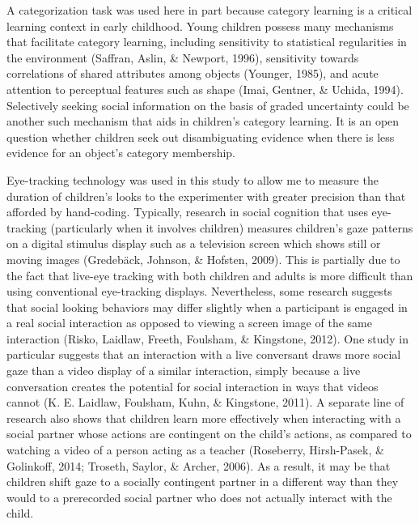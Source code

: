 \documentclass[floatsintext,man]{apa6}
\theoremstyle{definition}
\theoremstyle{definition}
\theoremstyle{definition}
\theoremstyle{remark}
\begin{document}
A categorization task was used here in part because category learning is
a critical learning context in early childhood. Young children possess
many mechanisms that facilitate category learning, including sensitivity
to statistical regularities in the environment (Saffran, Aslin, \&
Newport, 1996), sensitivity towards correlations of shared attributes
among objects (Younger, 1985), and acute attention to perceptual
features such as shape (Imai, Gentner, \& Uchida, 1994). Selectively
seeking social information on the basis of graded uncertainty could be
another such mechanism that aids in children's category learning. It is
an open question whether children seek out disambiguating evidence when
there is less evidence for an object's category membership.

Eye-tracking technology was used in this study to allow me to measure
the duration of children's looks to the experimenter with greater
precision than that afforded by hand-coding. Typically, research in
social cognition that uses eye-tracking (particularly when it involves
children) measures children's gaze patterns on a digital stimulus
display such as a television screen which shows still or moving images
(Gredebäck, Johnson, \& Hofsten, 2009). This is partially due to the
fact that live-eye tracking with both children and adults is more
difficult than using conventional eye-tracking displays. Nevertheless,
some research suggests that social looking behaviors may differ slightly
when a participant is engaged in a real social interaction as opposed to
viewing a screen image of the same interaction (Risko, Laidlaw, Freeth,
Foulsham, \& Kingstone, 2012). One study in particular suggests that an
interaction with a live conversant draws more social gaze than a video
display of a similar interaction, simply because a live conversation
creates the potential for social interaction in ways that videos cannot
(K. E. Laidlaw, Foulsham, Kuhn, \& Kingstone, 2011). A separate line of
research also shows that children learn more effectively when
interacting with a social partner whose actions are contingent on the
child's actions, as compared to watching a video of a person acting as a
teacher (Roseberry, Hirsh-Pasek, \& Golinkoff, 2014; Troseth, Saylor, \&
Archer, 2006). As a result, it may be that children shift gaze to a
socially contingent partner in a different way than they would to a
prerecorded social partner who does not actually interact with the
child.
\end{document}
